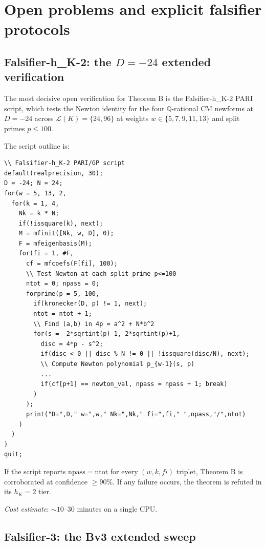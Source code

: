 \documentclass[11pt,a4paper]{amsart}
\theoremstyle{definition}
\newcommand{\Q}{\mathbb{Q}}
\newcommand{\Lcal}{\mathcal{L}}
\newcommand{\hK}{h_{K}}
\begin{document}
\section{Open problems and explicit falsifier protocols}\label{sec:openproblems}

\subsection{Falsifier-h\_K-2: the $D = -24$ extended verification}\label{sec:falsifier-hK2}

The most decisive open verification for Theorem B is the Falsifier-h\_K-2 PARI script, which tests the Newton identity for the four $\Q$-rational CM newforms at $D = -24$ across $\Lcal(K) = \{24, 96\}$ at weights $w \in \{5, 7, 9, 11, 13\}$ and split primes $p \le 100$.

The script outline is:
\begin{verbatim}
\\ Falsifier-h_K-2 PARI/GP script
default(realprecision, 30);
D = -24; N = 24;
for(w = 5, 13, 2,
  for(k = 1, 4,
    Nk = k * N;
    if(!issquare(k), next);
    M = mfinit([Nk, w, D], 0);
    F = mfeigenbasis(M);
    for(fi = 1, #F,
      cf = mfcoefs(F[fi], 100);
      \\ Test Newton at each split prime p<=100
      ntot = 0; npass = 0;
      forprime(p = 5, 100,
        if(kronecker(D, p) != 1, next);
        ntot = ntot + 1;
        \\ Find (a,b) in 4p = a^2 + N*b^2
        for(s = -2*sqrtint(p)-1, 2*sqrtint(p)+1,
          disc = 4*p - s^2;
          if(disc < 0 || disc % N != 0 || !issquare(disc/N), next);
          \\ Compute Newton polynomial p_{w-1}(s, p)
          ...
          if(cf[p+1] == newton_val, npass = npass + 1; break)
        )
      );
      print("D=",D," w=",w," Nk=",Nk," fi=",fi," ",npass,"/",ntot)
    )
  )
)
quit;
\end{verbatim}

If the script reports $\mathrm{npass} = \mathrm{ntot}$ for every $(w, k, fi)$ triplet, Theorem B is corroborated at confidence $\ge 90\%$. If any failure occurs, the theorem is refuted in its $\hK = 2$ tier.

\emph{Cost estimate}: $\sim 10$--$30$ minutes on a single CPU.

\subsection{Falsifier-3: the Bv3 extended sweep}\label{sec:falsifier-3}
\end{document}
